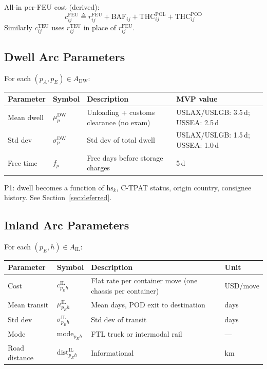 \documentclass[11pt,a4paper]{article}
\newcommand{\defeq}{\triangleq}
\theoremstyle{definition}
\begin{document}
\noindent All-in per-FEU cost (derived):
\[
  c_{ij}^{\text{FEU}} \defeq r_{ij}^{\text{FEU}} + \text{BAF}_{ij} + \text{THC}_{ij}^{\text{POL}} + \text{THC}_{ij}^{\text{POD}}
\]
Similarly $c_{ij}^{\text{TEU}}$ uses $r_{ij}^{\text{TEU}}$ in place of $r_{ij}^{\text{FEU}}$.

\subsection{Dwell Arc Parameters}

For each $(p_A, p_E) \in A_{\text{DW}}$:

\begin{center}
\begin{tabular}{llp{5cm}l}
\toprule
Parameter & Symbol & Description & MVP value \\
\midrule
Mean dwell & $\mu_p^{\text{DW}}$ & Unloading + customs clearance (no exam) & USLAX/USLGB: 3.5\,d; USSEA: 2.5\,d \\
Std dev & $\sigma_p^{\text{DW}}$ & Std dev of total dwell & USLAX/USLGB: 1.5\,d; USSEA: 1.0\,d \\
Free time & $f_p$ & Free days before storage charges & 5\,d \\
\bottomrule
\end{tabular}
\end{center}

\noindent P1: dwell becomes a function of $\text{hs}_k$, C-TPAT status, origin country, consignee
history. See Section~\ref{sec:deferred}.

\subsection{Inland Arc Parameters}

For each $(p_E, h) \in A_{\text{IL}}$:

\begin{center}
\begin{tabular}{llp{5.5cm}l}
\toprule
Parameter & Symbol & Description & Unit \\
\midrule
Cost & $c_{p_E h}^{\text{IL}}$ & Flat rate per container move (one chassis per container) & USD/move \\
Mean transit & $\mu_{p_E h}^{\text{IL}}$ & Mean days, POD exit to destination & days \\
Std dev & $\sigma_{p_E h}^{\text{IL}}$ & Std dev of transit & days \\
Mode & $\text{mode}_{p_E h}$ & FTL truck or intermodal rail & — \\
Road distance & $\text{dist}_{p_E h}^{\text{IL}}$ & Informational & km \\
\bottomrule
\end{tabular}
\end{center}
\end{document}
